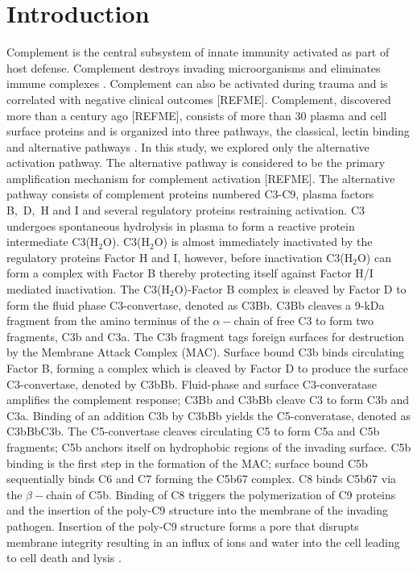 \documentclass[12pt]{article}
\begin{document}
\section*{Introduction}
Complement is the central subsystem of innate immunity activated as part of host defense.
Complement destroys invading microorganisms and eliminates immune complexes \cite{WALPORT1}.
Complement can also be activated during trauma and is correlated with negative clinical outcomes [REFME].
Complement, discovered more than a century ago [REFME], consists of more than 30 plasma and cell surface proteins and is organized into three pathways, 
the classical, lectin binding and alternative pathways \cite{WALPORT1}.
In this study, we explored only the alternative activation pathway. 
The alternative pathway is considered to be the primary amplification mechanism for complement activation [REFME].
The alternative pathway consists of complement proteins numbered C3-C9, plasma factors B,~D,~H and I and several regulatory proteins restraining activation. 
C3 undergoes spontaneous hydrolysis in plasma to form a reactive protein intermediate C3(H$_2$O). 
C3(H$_2$O) is almost immediately inactivated by the regulatory proteins Factor H and I, however, before inactivation C3(H$_2$O) can form a complex with Factor B thereby protecting itself against Factor H/I mediated inactivation. The C3(H$_2$O)-Factor B complex is cleaved by Factor D to form the fluid phase C3-convertase, denoted as C3Bb. C3Bb cleaves a 9-kDa fragment from the amino terminus of the $\alpha-$chain of free C3 to form two fragments, C3b and C3a. The C3b fragment tags foreign surfaces for destruction by the Membrane Attack
Complex (MAC). Surface bound C3b binds circulating Factor B, forming a complex which is cleaved by Factor D to produce the surface C3-convertase, denoted by C3bBb.
Fluid-phase and surface  C3-converatase amplifies the complement response; C3Bb and C3bBb cleave C3 to form C3b and C3a. Binding of
an addition C3b by C3bBb yields the C5-converatase, denoted as C3bBbC3b. The C5-convertase cleaves circulating C5 to form C5a and C5b fragments; C5b anchors itself on
hydrophobic regions of the invading surface. C5b binding is the first step in the formation of the MAC; surface bound C5b sequentially binds C6 and C7 forming the
C5b67 complex. C8 binds C5b67 via the $\beta-$chain of C5b. Binding of C8 triggers the polymerization of C9 proteins and the insertion of the poly-C9 structure
into the membrane of the invading pathogen. Insertion of the poly-C9 structure forms a pore that disrupts membrane integrity resulting in an influx of ions
and water into the cell leading to cell death and lysis \cite{WALPORT2}. 
\end{document}
